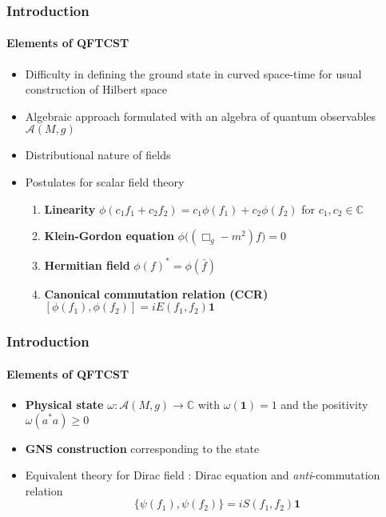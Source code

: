 \documentclass[french]{beamer}
\begin{document}
\begin{frame}
\frametitle{Introduction}
\framesubtitle{Elements of QFTCST}

\begin{itemize}
\item Difficulty in defining the ground state in curved space-time for usual construction of Hilbert space
\item Algebraic approach formulated with an algebra of quantum observables $\mathscr{A}(M,g)$
\item Distributional nature of fields
\item Postulates for scalar field theory
 \begin{enumerate}
  \item \textbf{Linearity} $\phi(c_1 f_1 + c_2 f_2) = c_1 \phi(f_1) + c_2 \phi(f_2)$ for $c_1, c_2 \in \mathbb{C}$
%
\item \textbf{Klein-Gordon equation} $\phi\big( (\Box_g - m^2)f \big) = 0$
%
\item \textbf{Hermitian field} $\phi(f)^* = \phi(\bar{f})$
%
\item \textbf{Canonical commutation relation (CCR)} $[\phi(f_1), \phi(f_2)] = iE(f_1, f_2) \mathbf{1}$
 \end{enumerate}
\end{itemize}

\end{frame}
\begin{frame}
\frametitle{Introduction}
\framesubtitle{Elements of QFTCST}
\begin{itemize}

\item \textbf{Physical state} $\omega: \mathscr{A}(M,g) \rightarrow \mathbb{C}$ with $\omega(\mathbf{1}) = 1$ and the positivity $\omega(a^*a) \geq 0$

\item \textbf{GNS construction} corresponding to the state 

\item Equivalent theory for Dirac field : Dirac equation and \textit{anti}-commutation relation
\begin{equation*}
\{\psi(f_1), \psi(f_2)\} = i S(f_1, f_2) \mathbf{1}
\end{equation*}


\end{itemize}

\end{frame}
\end{document}
